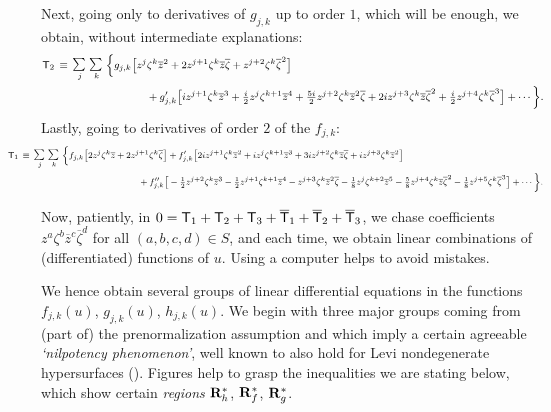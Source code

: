 \documentclass[12pt,twoside,leqno,openany]{amsart}
\begin{document}
Next, going
only to derivatives of $g_{j,k}$ up to order $1$, which
will be enough, we obtain, without intermediate explanations:
\[
\footnotesize
\aligned
{\sf T}_2
&
\,\equiv\,
\smallsum{j}\,\smallsum{k}\,
\Big\{
g_{j,k}
\big[
z^j\zeta^k\overline{z}^2
+
2z^{j+1}\zeta^k\overline{z}\overline{\zeta}
+
z^{j+2}\zeta^k\overline{\zeta}^2
\big]
\\
&
\ \ \ \ \ \ \ \ \ \ \ \ \ \ \ \ \ \ \ \ \ \ \ \ \ \
+
g_{j,k}'
\big[
iz^{j+1}\zeta^k\overline{z}^3
+
\tfrac{i}{2}z^j\zeta^{k+1}\overline{z}^4
+
\tfrac{5i}{2}z^{j+2}\zeta^k\overline{z}^2\overline{\zeta}
+
2iz^{j+3}\zeta^k\overline{z}\overline{\zeta}^2
+
\tfrac{i}{2}z^{j+4}\zeta^k\overline{\zeta}^3
\big]
+\cdots
\Big\}.
\endaligned
\]
Lastly, going to derivatives of order $2$ of the $f_{j,k}$:
\[
\!\!\!\!\!\!\!\!\!\!\!\!\!\!\!\!\!\!\!\!
\footnotesize
\aligned
{\sf T}_1
&
\,\equiv\,
\smallsum{j}\,\smallsum{k}\,
\Big\{
f_{j,k}
\big[
2z^j\zeta^k\overline{z}
+
2z^{j+1}\zeta^k\overline{\zeta}
\big]
+
f_{j,k}'
\big[
2iz^{j+1}\zeta^k\overline{z}^2
+
iz^j\zeta^{k+1}\overline{z}^3
+
3iz^{j+2}\zeta^k\overline{z}\overline{\zeta}
+
iz^{j+3}\zeta^k\overline{z}^2
\big]
\\
&
\ \ \ \ \ \ \ \ \ \ \ \ \ \ \ \ \ \ \ \ \ \ \ \ \ \ \ \ \ \ \ \ \ \ \
\ \ \ \ \ 
+
f_{j,k}''
\big[
-\tfrac{1}{2}z^{j+2}\zeta^k\overline{z}^3
-
\tfrac{1}{2}z^{j+1}\zeta^{k+1}\overline{z}^4
-
z^{j+3}\zeta^k\overline{z}^2\overline{\zeta}
-
\tfrac{1}{8}z^j\zeta^{k+2}\overline{z}^5
-
\tfrac{5}{8}z^{j+4}\zeta^k\overline{z}\overline{\zeta}^2
-
\tfrac{1}{8}z^{j+5}\zeta^k\overline{\zeta}^3
\big]
+
\cdots
\Big\}.
\endaligned
\]

Now, patiently, in $0 = {\sf T}_1 + {\sf T}_2 + {\sf T}_3 + 
\overline{\sf T}_1 + \overline{\sf T}_2 + \overline{\sf T}_3$, 
we chase coefficients 
$z^a \zeta^b \overline{z}^c \overline{\zeta}^d$
for all $(a, b, c, d) \in S$,
and each time, we obtain linear combinations of
(differentiated) 
functions of $u$.
Using a computer helps to avoid mistakes.

We hence obtain several groups of linear differential equations
in the functions $f_{j,k}(u)$, 
$g_{j,k}(u)$, $h_{j,k}(u)$. We begin with three major groups
coming from (part of) the prenormalization assumption and
which imply a certain agreeable {\sl `nilpotency phenomenon'},
well known to also hold for Levi nondegenerate
hypersurfaces ({\cite{Chern-Moser-1974,
Jacobowitz-1990, Merker-2020}}).
Figures help to grasp the inequalities we are stating below,
which show certain {\sl regions} 
${\bf R}_h^\ast$, ${\bf R}_f^\ast$, ${\bf R}_g^\ast$.
\end{document}
